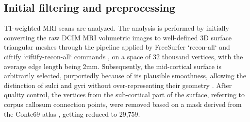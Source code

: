 \subsection{Initial filtering and preprocessing}
\label{subsec:pheno_preproc}
T1-weighted MRI scans are analyzed. The analysis is performed by initially converting the raw DCIM MRI volumetric images to well-defined 3D surface triangular meshes through the pipeline applied by FreeSurfer `recon-all` \cite{Reuter2012} and ciftify `ciftify-recon-all` commands \cite{Dickie2019}, on a space of 32 thousand vertices, with the average edge length being 2mm. Subsequently, the mid-cortical surface is arbitrarily selected, purportedly because of its plausible smoothness, allowing the distinction of sulci and gyri without over-representing their geometry \cite{Naqvi2021}. After quality control,  the vertices from the sub-cortical part of the surface, referring to corpus callosum connection points, were removed based on a mask derived from the Conte69 atlas \cite{Glasser2011}, getting reduced to 29,759.

